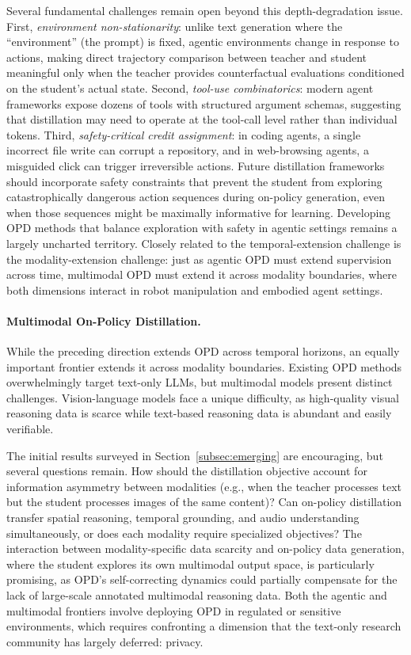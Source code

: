 \documentclass{article} %
\begin{document}
Several fundamental challenges remain open beyond this depth-degradation issue. First, \emph{environment non-stationarity}: unlike text generation where the ``environment'' (the prompt) is fixed, agentic environments change in response to actions, making direct trajectory comparison between teacher and student meaningful only when the teacher provides counterfactual evaluations conditioned on the student's actual state. Second, \emph{tool-use combinatorics}: modern agent frameworks expose dozens of tools with structured argument schemas, suggesting that distillation may need to operate at the tool-call level rather than individual tokens. Third, \emph{safety-critical credit assignment}: in coding agents, a single incorrect file write can corrupt a repository, and in web-browsing agents, a misguided click can trigger irreversible actions. Future distillation frameworks should incorporate safety constraints that prevent the student from exploring catastrophically dangerous action sequences during on-policy generation, even when those sequences might be maximally informative for learning. Developing OPD methods that balance exploration with safety in agentic settings remains a largely uncharted territory. Closely related to the temporal-extension challenge is the modality-extension challenge: just as agentic OPD must extend supervision across time, multimodal OPD must extend it across modality boundaries, where both dimensions interact in robot manipulation and embodied agent settings.

\paragraph{Multimodal On-Policy Distillation.}
While the preceding direction extends OPD across temporal horizons, an equally important frontier extends it across modality boundaries. Existing OPD methods overwhelmingly target text-only LLMs, but multimodal models present distinct challenges. Vision-language models face a unique difficulty, as high-quality visual reasoning data is scarce while text-based reasoning data is abundant and easily verifiable.

The initial results surveyed in Section~\ref{subsec:emerging} are encouraging, but several questions remain. How should the distillation objective account for information asymmetry between modalities (e.g., when the teacher processes text but the student processes images of the same content)? Can on-policy distillation transfer spatial reasoning, temporal grounding, and audio understanding simultaneously, or does each modality require specialized objectives? The interaction between modality-specific data scarcity and on-policy data generation, where the student explores its own multimodal output space, is particularly promising, as OPD's self-correcting dynamics could partially compensate for the lack of large-scale annotated multimodal reasoning data. Both the agentic and multimodal frontiers involve deploying OPD in regulated or sensitive environments, which requires confronting a dimension that the text-only research community has largely deferred: privacy.
\end{document}
